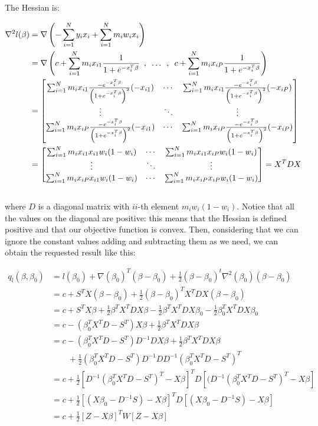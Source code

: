 \documentclass{article}
\begin{document}
The Hessian is:

\begin{align*}
\nabla^2 l(\beta)&=\nabla \left(-\sum_{i=1}^N y_i x_i+\sum_{i=1}^N m_i w_i x_i\right)\\
				 &=\nabla \left( c+\sum_{i=1}^N m_i x_{i1}\frac{1}{1+e^{-x_i^T\beta}}\enskip,\enskip \dots \enskip,\enskip c+\sum_{i=1}^N m_i x_{iP}\frac{1}{1+e^{-x_i^T\beta}} \right)\\
				 &=\begin{bmatrix} \sum_{i=1}^N m_i x_{i1}\frac{-e^{-x_i^T\beta}}{\left(1+e^{-x_i^T\beta}\right)^2}(-x_{i1}) & \cdots & \sum_{i=1}^N m_i x_{i1}\frac{-e^{-x_i^T\beta}}{\left(1+e^{-x_i^T\beta}\right)^2}(-x_{iP}) \\ \vdots & \ddots & \vdots \\ \sum_{i=1}^N m_i x_{iP}\frac{-e^{-x_i^T\beta}}{\left(1+e^{-x_i^T\beta}\right)^2}(-x_{i1}) & \cdots & \sum_{i=1}^N m_i x_{iP}\frac{-e^{-x_i^T\beta}}{\left(1+e^{-x_i^T\beta}\right)^2}(-x_{iP}) \end{bmatrix}\\
				 &=\begin{bmatrix} \sum_{i=1}^N m_i x_{i1}x_{i1}w_i(1-w_i) & \cdots & \sum_{i=1}^N m_i x_{i1}x_{iP}w_i(1-w_i) \\ \vdots & \ddots & \vdots \\ \sum_{i=1}^N m_i x_{iP}x_{i1}w_i(1-w_i) & \cdots & \sum_{i=1}^N m_i x_{iP}x_{iP}w_i(1-w_i) \end{bmatrix}=X^TDX
\end{align*}\\

where $D$ is a diagonal matrix with $ii$-th element $m_i w_i (1-w_i)$. Notice that all the values on the diagonal are positive: this means that the Hessian is defined positive and that our objective function is convex. Then, considering that we can ignore the constant values adding and subtracting them as we need, we can obtain the requested result like this:

\begin{align*}
q_l(\beta,\beta_0)&=l(\beta_0)+\nabla(\beta_0)^T(\beta-\beta_0)+\frac{1}{2}(\beta-\beta_0)^t\nabla^2(\beta_0)(\beta-\beta_0)\\
				  &=c+S^TX(\beta-\beta_0)+\frac{1}{2}(\beta-\beta_0)^TX^TDX(\beta-\beta_0)\\				  
				  &=c+S^TX\beta+\frac{1}{2}\beta^TX^TDX\beta-\frac{1}{2}\beta^TX^TDX\beta_0-\frac{1}{2}\beta_0^TX^TDX\beta_0\\
				  &=c-(\beta_0^TX^TD-S^T)X\beta+\frac{1}{2}\beta^TX^TDX\beta\\
				  &=c-(\beta_0^TX^TD-S^T)D^{-1}DX\beta+\frac{1}{2}\beta^TX^TDX\beta\\
				  &\qquad+\frac{1}{2}(\beta_0^TX^TD-S^T)D^{-1}DD^{-1}(\beta_0^TX^TD-S^T)^T\\
				  &=c+\frac{1}{2}[D^{-1}(\beta_0^TX^TD-S^T)^T-X\beta]^TD[(D^{-1}(\beta_0^TX^TD-S^T)^T-X\beta]\\
				  &=c+\frac{1}{2}[(X\beta_0-D^{-1}S)-X\beta]^TD[(X\beta_0-D^{-1}S)-X\beta]\\
 				  &=c+\frac{1}{2}[Z-X\beta]^TW[Z-X\beta]
\end{align*}\\
\end{document}
